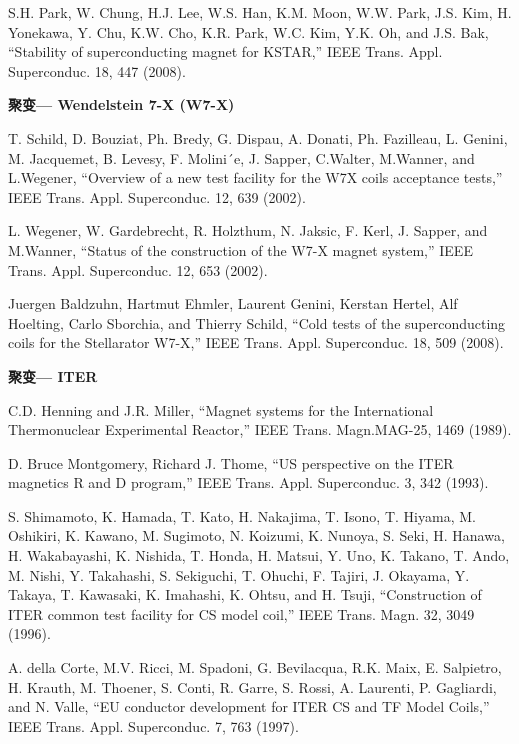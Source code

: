 \noindent [9.38] S.H. Park, W. Chung, H.J. Lee, W.S. Han, K.M. Moon, W.W. Park, J.S. Kim,
H. Yonekawa, Y. Chu, K.W. Cho, K.R. Park, W.C. Kim, Y.K. Oh, and J.S. Bak,
``Stability of superconducting magnet for KSTAR,” IEEE Trans. Appl. Superconduc.
18, 447 (2008).

\noindent \textbf{聚变--- Wendelstein 7-X (W7-X) }

\noindent [9.39] T. Schild, D. Bouziat, Ph. Bredy, G. Dispau, A. Donati, Ph. Fazilleau, L. Genini,
M. Jacquemet, B. Levesy, F. Molini´e, J. Sapper, C.Walter, M.Wanner, and L.Wegener,
``Overview of a new test facility for the W7X coils acceptance tests,” IEEE
Trans. Appl. Superconduc. 12, 639 (2002).

\noindent [9.40] L. Wegener, W. Gardebrecht, R. Holzthum, N. Jaksic, F. Kerl, J. Sapper, and
M.Wanner, ``Status of the construction of the W7-X magnet system,” IEEE Trans.
Appl. Superconduc. 12, 653 (2002).

\noindent [9.41] Juergen Baldzuhn, Hartmut Ehmler, Laurent Genini, Kerstan Hertel, Alf Hoelting,
Carlo Sborchia, and Thierry Schild, ``Cold tests of the superconducting coils for
the Stellarator W7-X,” IEEE Trans. Appl. Superconduc. 18, 509 (2008).

\noindent \textbf{聚变--- ITER }

\noindent [9.42] C.D. Henning and J.R. Miller, ``Magnet systems for the International Thermonuclear Experimental Reactor,” IEEE Trans. Magn.MAG-25, 1469 (1989).

\noindent [9.43] D. Bruce Montgomery, Richard J. Thome, ``US perspective on the ITER magnetics R and D program,” IEEE Trans. Appl. Superconduc. 3, 342 (1993).

\noindent [9.44] S. Shimamoto, K. Hamada, T. Kato, H. Nakajima, T. Isono, T. Hiyama, M. Oshikiri,
K. Kawano, M. Sugimoto, N. Koizumi, K. Nunoya, S. Seki, H. Hanawa,
H. Wakabayashi, K. Nishida, T. Honda, H. Matsui, Y. Uno, K. Takano, T. Ando,
M. Nishi, Y. Takahashi, S. Sekiguchi, T. Ohuchi, F. Tajiri, J. Okayama, Y. Takaya,
T. Kawasaki, K. Imahashi, K. Ohtsu, and H. Tsuji, ``Construction of ITER common
test facility for CS model coil,” IEEE Trans. Magn. 32, 3049 (1996).

\noindent [9.45] A. della Corte, M.V. Ricci, M. Spadoni, G. Bevilacqua, R.K. Maix, E. Salpietro,
H. Krauth, M. Thoener, S. Conti, R. Garre, S. Rossi, A. Laurenti, P. Gagliardi,
and N. Valle, ``EU conductor development for ITER CS and TF Model Coils,”
IEEE Trans. Appl. Superconduc. 7, 763 (1997).

